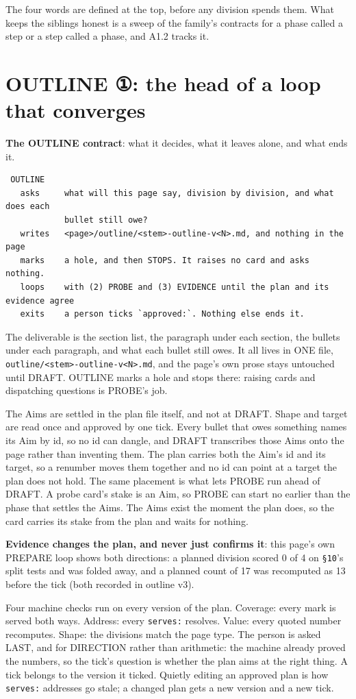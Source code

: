 The four words are defined at the top, before any division spends them. What keeps the siblings honest is a sweep of the family's contracts for a phase called a step or a step called a phase, and A1.2 tracks it.


\section{OUTLINE ①: the head of a loop that converges}
\textbf{The OUTLINE contract}: what it decides, what it leaves alone, and what ends it.

\begin{verbatim}
 OUTLINE
   asks     what will this page say, division by division, and what does each
            bullet still owe?
   writes   <page>/outline/<stem>-outline-v<N>.md, and nothing in the page
   marks    a hole, and then STOPS. It raises no card and asks nothing.
   loops    with (2) PROBE and (3) EVIDENCE until the plan and its evidence agree
   exits    a person ticks `approved:`. Nothing else ends it.
\end{verbatim}
The deliverable is the section list, the paragraph under each section, the bullets under each paragraph, and what each bullet still owes. It all lives in ONE file, \texttt{outline/<stem>-outline-v<N>.md}, and the page's own prose stays untouched until DRAFT. OUTLINE marks a hole and stops there: raising cards and dispatching questions is PROBE's job.

The Aims are settled in the plan file itself, and not at DRAFT. Shape and target are read once and approved by one tick. Every bullet that owes something names its Aim by id, so no id can dangle, and DRAFT transcribes those Aims onto the page rather than inventing them. The plan carries both the Aim's id and its target, so a renumber moves them together and no id can point at a target the plan does not hold. The same placement is what lets PROBE run ahead of DRAFT. A probe card's stake is an Aim, so PROBE can start no earlier than the phase that settles the Aims. The Aims exist the moment the plan does, so the card carries its stake from the plan and waits for nothing.

\textbf{Evidence changes the plan, and never just confirms it}: this page's own PREPARE loop shows both directions: a planned division scored 0 of 4 on \texttt{§10}'s split tests and was folded away, and a planned count of 17 was recomputed as 13 before the tick (both recorded in outline v3).

Four machine checks run on every version of the plan. Coverage: every mark is served both ways. Address: every \texttt{serves:} resolves. Value: every quoted number recomputes. Shape: the divisions match the page type. The person is asked LAST, and for DIRECTION rather than arithmetic: the machine already proved the numbers, so the tick's question is whether the plan aims at the right thing. A tick belongs to the version it ticked. Quietly editing an approved plan is how \texttt{serves:} addresses go stale; a changed plan gets a new version and a new tick.

